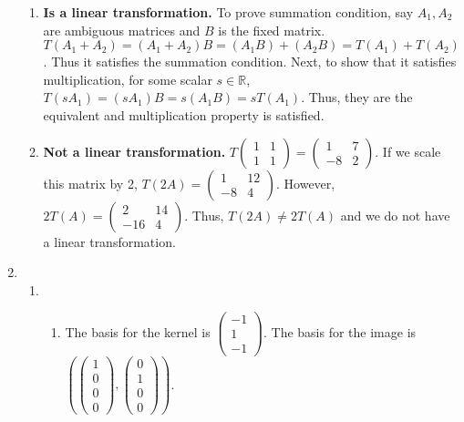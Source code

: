 \documentclass{article}
\begin{document}
\begin{enumerate}
\begin{enumerate}
\item \textbf{Is a linear transformation.} To prove summation condition, say $A_1, A_2$ are ambiguous matrices and $B$ is the fixed matrix. $T(A_1 + A_2) = (A_1 + A_2) B = (A_1 B) + (A_2 B) = T(A_1) + T(A_2)$. Thus it satisfies the summation condition. Next, to show that it satisfies multiplication, for some scalar $s \in \mathbb{R}$, $T(sA_1) = (sA_1)B = s(A_1 B) = sT(A_1)$. Thus, they are the equivalent and multiplication property is satisfied.

\item \textbf{Not a linear transformation.} $T\left(\begin{array}{cc} 1 & 1 \\ 1 & 1 \end{array}\right) = \left(\begin{array}{cc} 1 & 7 \\ -8 & 2 \end{array}\right)$. If we scale this matrix by 2, $T(2A) = \left(\begin{array}{cc} 1 & 12 \\ -8 & 4 \end{array}\right)$. However, $2 T(A) = \left(\begin{array}{cc} 2 & 14 \\ -16 & 4 \end{array}\right)$. Thus, $T(2A) \neq 2T(A)$ and we do not have a linear transformation.

\end{enumerate}

\item

\begin{enumerate}

\item 

\begin{enumerate}

\item The basis for the kernel is $\left(\begin{array}{c} -1 \\ 1 \\ -1 \end{array}\right)$. The basis for the image is $\left(\left(\begin{array}{c} 1 \\ 0 \\ 0 \\ 0 \end{array}\right), \left(\begin{array}{c} 0 \\ 1 \\ 0 \\ 0 \end{array}\right)\right)$.


\end{enumerate}
\end{enumerate}
\end{enumerate}
\end{document}
